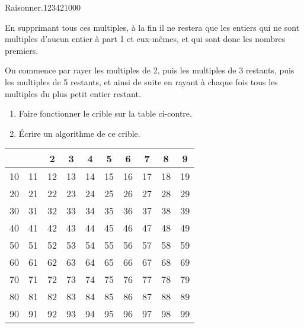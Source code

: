 \begin{pageParcourst}
\begin{ExoCt}{Raisonner.}{1234}{2}{1}{0}{0}{0}
\begin{minipage}{0.5\linewidth}
En supprimant tous ces multiples, à la fin il ne restera que les entiers qui ne sont multiples d'aucun entier à part 1 et eux-mêmes, et qui sont donc les nombres premiers.

On commence par rayer les multiples de 2, puis les multiples de 3 restants, puis les multiples de 5 restants, et ainsi de suite en rayant à chaque fois tous les multiples du plus petit entier restant.

\begin{enumerate}

\item Faire fonctionner le crible sur la table ci-contre.
\item Écrire un algorithme de ce crible. 

\end{enumerate}

\end{minipage}
\begin{minipage}{0.5\linewidth}

 


\begin{tabular}{|c|c|c|c|c|c|c|c|c|c|}
 \hline 
 &  & 2 & 3 & 4 & 5 & 6 & 7 & 8 & 9 \\ 
 \hline 
 10&11 & 12 & 13 & 14 & 15 & 16 & 17 & 18 & 19 \\
 \hline 
 20&21 & 22 & 23 & 24 & 25 & 26 & 27 & 28 & 29 \\
 \hline 
 30&31 & 32 & 33 & 34 & 35 & 36 & 37 & 38 & 39 \\
 \hline 
 40&41 & 42 & 43 & 44 & 45 & 46 & 47 & 48 & 49 \\
 \hline 
 50&51 & 52 & 53 & 54 & 55 & 56 & 57 & 58 & 59 \\
 \hline 
 60&61 & 62 & 63 & 64 & 65 & 66 & 67 & 68 & 69 \\
 \hline 
 70&71 & 72 & 73 & 74 & 75 & 76 & 77 & 78 & 79 \\
 \hline 
 80&81 & 82 & 83 & 84 & 85 & 86 & 87 & 88 & 89 \\
 \hline 
 90&91 & 92 & 93 & 94 & 95 & 96 & 97 & 98 & 99 \\
 \hline 
 \end{tabular}  
 
 \end{minipage}


 
\end{ExoCt}
 
\end{pageParcourst}
%


